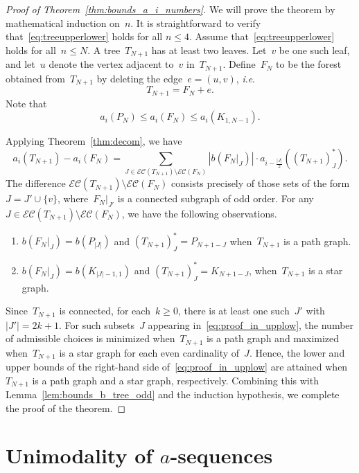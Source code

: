 \documentclass[10pt]{amsart}
\theoremstyle{plain}
\numberwithin{equation}{section}
\theoremstyle{definition}
\newcommand{\EC}{\mathcal{E}\mathcal{C}}
\newcommand{\ie}{\textit{i}.\textit{e}. }
\begin{document}
\begin{proof}[Proof of Theorem~\ref{thm:bounds_a_i_numbers}]
    We will prove the theorem by mathematical induction on~$n$.
    It is straightforward to verify that~\eqref{eq:treeupperlower} holds for all $n \le 4$.
Assume that~\eqref{eq:treeupperlower} holds for all~$n \le N$.
A tree~$T_{N+1}$ has at least two leaves.
Let~$v$ be one such leaf, and let~$u$ denote the vertex adjacent to~$v$ in~$T_{N+1}$.
Define~$F_N$ to be the forest obtained from~$T_{N+1}$ by deleting the edge~$e=(u,v)$, \ie
$$
T_{N+1}=F_N+e.
$$
Note that
$$
a_i(P_{N}) \leq a_i(F_N) \leq a_i(K_{1,N-1}).
$$

Applying Theorem~\ref{thm:decom}, we have
\begin{equation}\label{eq:proof_in_upplow}
  a_i(T_{N+1}) - a_i(F_N) = \sum_{J \in \EC(T_{N+1}) \setminus \EC(F_{N})}\left\vert  b(F_N\vert_J) \right\vert \cdot a_{i- \frac{|J|}{2}}((T_{N+1})^\ast_{J}).
\end{equation}
The difference $\EC(T_{N+1})\setminus \EC(F_N)$ consists precisely of those sets of the form $J = J'\cup \{v\}$, where~$F_{N}\vert_{J'}$ is a connected subgraph of odd order.
For any~$J \in \EC(T_{N+1}) \setminus \EC(F_N)$, we have the following observations.
\begin{enumerate}
  \item $b(F_N\vert_J) = b(P_{|J|})$ and $ (T_{N+1})^\ast_J = P_{N+1-J}$ when~$T_{N+1}$ is a path graph.
  \item $b(F_N\vert_J) = b(K_{|J|-1,1})$ and $ (T_{N+1})^\ast_J = K_{N+1-J}$, when~$T_{N+1}$ is a star graph.
\end{enumerate}

Since~$T_{N+1}$ is connected, for each~$k \geq 0$, there is at least one such~$J'$ with~$|J'| = 2k+1$.
For such subsets~$J$ appearing in~\eqref{eq:proof_in_upplow}, the number of admissible choices is minimized when~$T_{N+1}$ is a path graph and maximized when~$T_{N+1}$ is a star graph for each even cardinality of~$J$.
Hence, the lower and upper bounds of the right-hand side of~\eqref{eq:proof_in_upplow} are attained when~$T_{N+1}$ is a path graph and a star graph, respectively.
Combining this with Lemma~\ref{lem:bounds_b_tree_odd} and the induction hypothesis, we complete the proof of the theorem.
\end{proof}



\section{Unimodality of $a$-sequences}\label{sec:unimodal}
 
\end{document}
